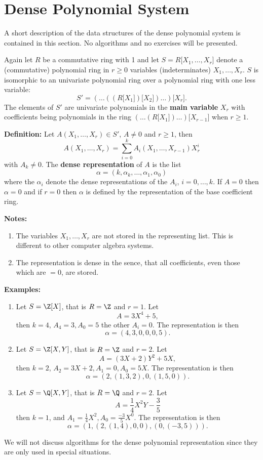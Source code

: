 \section{Dense Polynomial System} %

A short description of the data structures of the 
dense polynomial system is contained in this section.
No algorithms and no exercises will be presented. 

Again let $R$ be a commutative ring with 1 and let 
$S = R \lbrack X_1, \ldots, X_r \rbrack$ denote a  
(commutative) polynomial ring in $r \geq 0$ variables  
(indeterminates) $X_1, \ldots, X_r$.
$S$ is isomorphic to an univariate polynomial ring 
over a polynomial ring with one less variable:
$$ S' =
 ( \ldots ( (R \lbrack X_1 \rbrack) \lbrack X_2 \rbrack ) 
   \ldots ) \lbrack X_r \rbrack.
$$
The elements of $S'$ are univariate polynomials in the 
{\bf main variable} $X_r$ with coefficients being 
polynomials in the ring  
$( \ldots (R\lbrack X_1 \rbrack ) \ldots) \lbrack X_{r-1} \rbrack$
when $r \geq 1$. 

{\bf Definition:}
Let $A(X_1, \ldots, X_r) \in S'$, $A \neq 0$ and $r \geq 1$,
then 
$$ A(X_1, \ldots, X_r) = 
   \sum_{i=0}^{k} A_i(X_1, \ldots, X_{r-1}) X_r^i
$$ 
with $A_k \neq 0$.
The {\bf dense representation} of $A$ is the list
$$
  \alpha = ( k, \alpha_k, \ldots, \alpha_1, \alpha_0 ) 
$$   
where the $\alpha_i$ denote the  
dense representations of the $A_i$, $i=0,\ldots,k$.  
If $A = 0$ then $\alpha = 0$ and 
if $r = 0$ then $\alpha$ is defined by the 
representation of the base coefficient ring.  

{\bf Notes:}
\begin{enumerate}
\item The variables $X_1, \ldots, X_r$ are not stored 
      in the representing list. This is different to 
      other computer algebra systems.
\item The representation is dense in the sence, that 
      all coefficients, even those which are $= 0$, are stored.
\end{enumerate}

{\bf Examples:}
\begin{enumerate}
\item Let $S = \Z \lbrack X \rbrack$, that is $R = \Z$ and $r = 1$.
      Let $$A = 3 X^4 + 5,$$
      then $k = 4$, $A_4 = 3, A_0 = 5$ the other $A_i = 0$. 
      The representation is then 
      $$ \alpha = ( 4, 3, 0, 0, 0, 5 ). $$
\item Let $S = \Z \lbrack X, Y \rbrack$, 
      that is $R = \Z$ and $r = 2$.
      Let $$A = ( 3 X + 2 ) Y^2 + 5 X,$$
      then $k = 2$, $A_2 = 3 X + 2, A_1 = 0, A_0 = 5 X$. 
      The representation is then 
      $$ \alpha = ( 2, ( 1, 3, 2 ), 0, ( 1, 5, 0 ) ). $$
\item Let $S = \Q \lbrack X, Y \rbrack$, 
      that is $R = \Q$ and $r = 2$.
      Let $$A = \frac{1}{4} X^2 Y - \frac{3}{5}$$
      then $k = 1$, and $A_1 = \frac{1}{4} X^2, 
                         A_0 = \frac{-3}{5} X^0$. 
      The representation is then 
      $$ \alpha = ( 1, ( 2, (1,4), 0, 0 ), ( 0, (-3,5) ) ). $$
\end{enumerate}

We will not discuss algorithms for the dense polynomial 
representation since they are only used in special situations.






